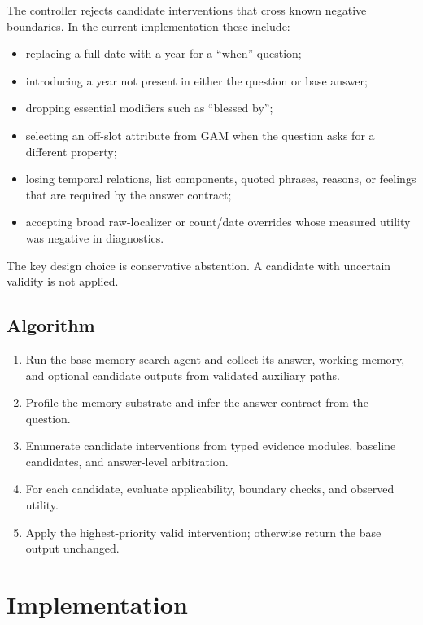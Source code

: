 \documentclass[11pt]{article}
\begin{document}
The controller rejects candidate interventions that cross known negative
boundaries. In the current implementation these include:

\begin{itemize}[leftmargin=*]
  \item replacing a full date with a year for a ``when'' question;
  \item introducing a year not present in either the question or base answer;
  \item dropping essential modifiers such as ``blessed by'';
  \item selecting an off-slot attribute from GAM when the question asks for a
  different property;
  \item losing temporal relations, list components, quoted phrases, reasons,
  or feelings that are required by the answer contract;
  \item accepting broad raw-localizer or count/date overrides whose measured
  utility was negative in diagnostics.
\end{itemize}

The key design choice is conservative abstention. A candidate with uncertain
validity is not applied.

\subsection{Algorithm}

\begin{enumerate}[leftmargin=*]
  \item Run the base memory-search agent and collect its answer, working
  memory, and optional candidate outputs from validated auxiliary paths.
  \item Profile the memory substrate and infer the answer contract from the
  question.
  \item Enumerate candidate interventions from typed evidence modules,
  baseline candidates, and answer-level arbitration.
  \item For each candidate, evaluate applicability, boundary checks, and
  observed utility.
  \item Apply the highest-priority valid intervention; otherwise return the
  base output unchanged.
\end{enumerate}

\section{Implementation}
\end{document}
